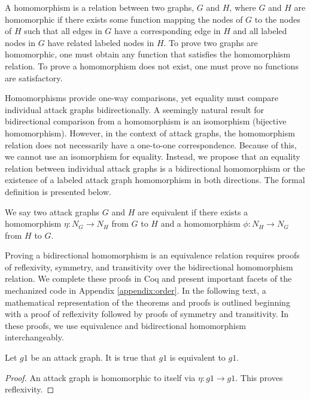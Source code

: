 \documentclass[runningheads]{llncs}
\theoremstyle{definition}
\begin{document}
A homomorphism is a relation between two graphs, $G$ and $H$, where $G$ and $H$ are homomorphic if there exists some function mapping the nodes of $G$ to the nodes of $H$ such that all edges in $G$ have a corresponding edge in $H$ and all labeled nodes in $G$ have related labeled nodes in $H$. To prove two graphs are homomorphic, one must obtain any function that satisfies the homomorphism relation. To prove a homomorphism does not exist, one must prove no functions are satisfactory. 

Homomorphisms provide one-way comparisons, yet equality must compare individual attack graphs bidirectionally. A seemingly natural result for bidirectional comparison from a homomorphism is an isomorphism (bijective homomorphism). However, in the context of attack graphs, the homomorphism relation does not necessarily have a one-to-one correspondence. Because of this, we cannot use an isomorphism for equality. Instead, we propose that an equality relation between individual attack graphs is a bidirectional homomorphism or the existence of a labeled attack graph homomorphism in both directions. The formal definition is presented below.

\begin{definition}
    We say two attack graphs $G$ and $H$ are equivalent if there exists a  homomorphism $\eta : N_G \to N_H$ from $G$ to $H$ and a homomorphism $\phi : N_H \to N_G$ from $H$ to $G$.
\end{definition}

Proving a bidirectional homomorphism is an equivalence relation requires proofs of reflexivity, symmetry, and transitivity over the bidirectional homomorphism relation. We complete these proofs in Coq and present important facets of the mechanized code in Appendix \ref{appendix:order}. In the following text, a mathematical representation of the theorems and proofs is outlined beginning with a proof of reflexivity followed by proofs of symmetry and transitivity. In these proofs, we use equivalence and bidirectional homomorphism interchangeably.

\begin{theorem}
    Let $g1$ be an attack graph. It is true that $g1$ is equivalent to $g1$.
\end{theorem}
\begin{proof}
    An attack graph is homomorphic to itself via $\eta : g1 \to g1$. This proves reflexivity. 
\end{proof}
\end{document}
